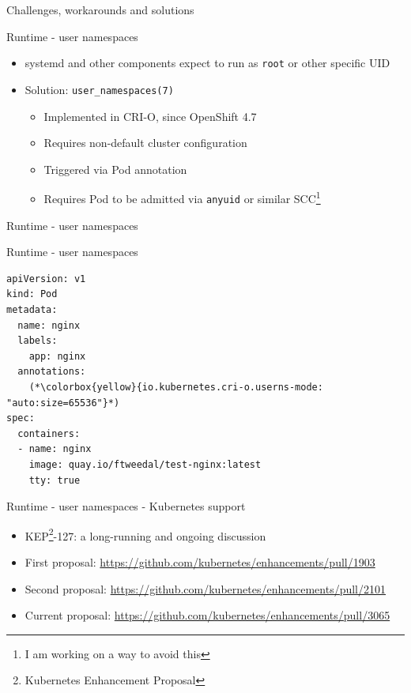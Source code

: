 \documentclass[ignorenonframetext,aspectratio=169,12pt]{beamer}
\def\svgwidth{4cm}
\begin{document}
\begin{frame}[plain]
\centering
\huge Challenges, workarounds and solutions
\end{frame}


\begin{frame}{Runtime - user namespaces}
\protect\hypertarget{freeipa-openshift-runtime-userns}{}
\begin{itemize}
\item systemd and other components expect to run as {\tt root} or
  other specific UID
\item Solution: {\tt user\_namespaces(7)}
  \begin{itemize}
  \item Implemented in CRI-O, since OpenShift 4.7
  \item Requires non-default cluster configuration
  \item Triggered via Pod annotation
  \item Requires Pod to be admitted via {\tt anyuid} or
        similar SCC\footnote{I am working on a way to avoid this}
  \end{itemize}
\end{itemize}
\end{frame}

\begin{frame}{Runtime - user namespaces}
\protect\hypertarget{runtime-userns-figure}{}
\begin{center}
\def\svgwidth{\textwidth}

\end{center}
\end{frame}

\begin{frame}[fragile]{Runtime - user namespaces}
\protect\hypertarget{runtime-userns-spec}{}
\begin{lstlisting}
apiVersion: v1
kind: Pod
metadata:
  name: nginx
  labels:
    app: nginx
  annotations:
    (*\colorbox{yellow}{io.kubernetes.cri-o.userns-mode: "auto:size=65536"}*)
spec:
  containers:
  - name: nginx
    image: quay.io/ftweedal/test-nginx:latest
    tty: true
\end{lstlisting}
\end{frame}

\begin{frame}{Runtime - user namespaces - Kubernetes support}
\protect\hypertarget{runtime-userns-kubernetes}{}
\begin{itemize}
\item KEP\footnote{Kubernetes Enhancement Proposal}-127: a long-running and ongoing discussion
\item First proposal: \url{https://github.com/kubernetes/enhancements/pull/1903}
\item Second proposal: \url{https://github.com/kubernetes/enhancements/pull/2101}
\item Current proposal: \url{https://github.com/kubernetes/enhancements/pull/3065}
\end{itemize}
\end{frame}
\end{document}
